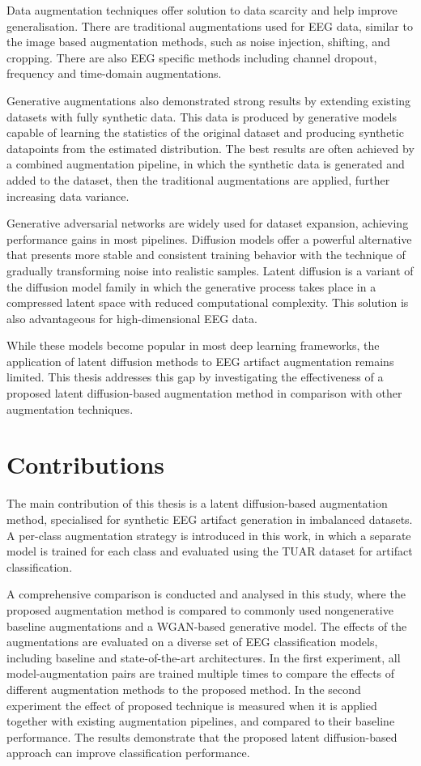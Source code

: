 Data augmentation techniques offer solution to data scarcity and help improve generalisation. There are traditional augmentations used for EEG data, similar to the image based augmentation methods, such as noise injection, shifting, and cropping. There are also EEG specific methods including channel dropout, frequency and time-domain augmentations.

Generative augmentations also demonstrated strong results by extending existing datasets with fully synthetic data. This data is produced by generative models capable of learning the statistics of the original dataset and producing synthetic datapoints from the estimated distribution. The best results are often achieved by a combined augmentation pipeline, in which the synthetic data is generated and added to the dataset, then the traditional augmentations are applied, further increasing data variance.

Generative adversarial networks are widely used for dataset expansion, achieving performance gains in most pipelines. Diffusion models offer a powerful alternative that presents more stable and consistent training behavior with the technique of gradually transforming noise into realistic samples. 
Latent diffusion is a variant of the diffusion model family in which the generative process takes place in a compressed latent space with reduced computational complexity. This solution is also advantageous for high-dimensional EEG data.

While these models become popular in most deep learning frameworks, the application of latent diffusion methods to EEG artifact augmentation remains limited. This thesis addresses this gap by investigating the effectiveness of a proposed latent diffusion-based augmentation method in comparison with other augmentation techniques.

\section{Contributions}

The main contribution of this thesis is a latent diffusion-based augmentation method, specialised for synthetic EEG artifact generation in imbalanced datasets. A per-class augmentation strategy is introduced in this work, in which a separate model is trained for each class and evaluated using the TUAR dataset for artifact classification.

A comprehensive comparison is conducted and analysed in this study, where the proposed augmentation method is compared to commonly used nongenerative baseline augmentations and a WGAN-based generative model. The effects of the augmentations are evaluated on a diverse set of EEG classification models, including baseline and state-of-the-art architectures. In the first experiment, all model-augmentation pairs are trained multiple times to compare the effects of different augmentation methods to the proposed method. In the second experiment the effect of proposed technique is measured when it is applied together with existing augmentation pipelines, and compared to their baseline performance. The results demonstrate that the proposed latent diffusion-based approach can improve classification performance.

